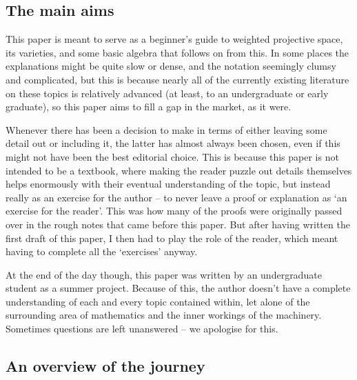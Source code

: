 \documentclass[10pt,notitlepage]{article}
\numberwithin{equation}{subsection}
\begin{document}

    




    \subsection{The main aims} %
    \label{sub:aims_of_this_paper}

    This paper is meant to serve as a beginner's guide to weighted projective space, its varieties, and some basic algebra that follows on from this.
    In some places the explanations might be quite slow or dense, and the notation seemingly clumsy and complicated, but this is because nearly all of the currently existing literature on these topics is relatively advanced (at least, to an undergraduate or early graduate), so this paper aims to fill a gap in the market, as it were.

    Whenever there has been a decision to make in terms of either leaving some detail out or including it, the latter has almost always been chosen, even if this might not have been the best editorial choice.
    This is because this paper is not intended to be a textbook, where making the reader puzzle out details themselves helps enormously with their eventual understanding of the topic, but instead really as an exercise for the author -- to never leave a proof or explanation as `an exercise for the reader'.
    This was how many of the proofs were originally passed over in the rough notes that came before this paper.
    But after having written the first draft of this paper, I then had to play the role of the reader, which meant having to complete all the `exercises' anyway.

    At the end of the day though, this paper was written by an undergraduate student as a summer project.
    Because of this, the author doesn't have a complete understanding of each and every topic contained within, let alone of the surrounding area of mathematics and the inner workings of the machinery.
    Sometimes questions are left unanswered -- we apologise for this.




    \subsection{An overview of the journey} %
    \label{sub:an_overview_of_the_journey}
\end{document}

